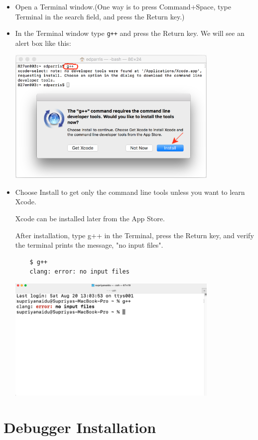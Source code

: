 \begin{itemize}
    \item Open a Terminal window.(One way is to press Command+Space, type Terminal in the search field, and press the Return key.)
    \item In the Terminal window type \texttt{g++} and press the Return key. We will see an alert box like this:

    \includegraphics[width=4in]{images/macVSCodeSetup/image9.png}

    \item Choose Install to get only the command line tools unless you want to learn Xcode.
    
    Xcode can be installed later from the App Store.
    
    After installation, type g++ in the Terminal, press the Return key, and verify the terminal prints the message, "no input files".
    \begin{verbatim}
    $ g++
    clang: error: no input files
    \end{verbatim}

    \includegraphics[width=4in]{images/macVSCodeSetup/image8.png}
\end{itemize}


\section{Debugger Installation}

